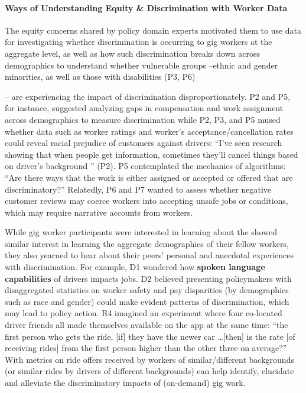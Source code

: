 \paragraph{{Ways of Understanding Equity \& Discrimination with Worker Data}} \label{data_disc} 

{The} equity concerns {shared by policy domain experts} motivated them to use data for investigating whether discrimination is occurring to gig workers {at the aggregate level, as well as how such discrimination breaks down across }demographics to understand whether vulnerable groups --ethnic and gender minorities{, as well as }those with disabilities (P3, P6){-- are experiencing the impact of discrimination disproportionately. P2 and P5{, for instance, suggested analyzing} gaps in compensation and work assignment across demographics to measure discrimination { while} P2, P3, and P5 mused whether data such as worker {ratings} and worker's {acceptance/cancellation} rates could reveal racial prejudice of customers against drivers: ``I've seen research showing that when people get information, sometimes they'll cancel things based on driver's background '' (P2). P5 {contemplated} the mechanics of algorithms: ``Are there ways that the work is either assigned or accepted or offered that are discriminatory?'' Relatedly, P6 and P7 wanted to assess whether negative customer reviews may coerce workers into accepting unsafe jobs or conditions, which may require narrative accounts from workers. 

While gig worker participants were 
interested in learning about the {showed similar interest in learning the aggregate }demographics of their fellow workers{, they also yearned to hear about their peers' personal and anecdotal} experiences with discrimination. For example, D1 {wondered} how \textbf{spoken language capabilities} of drivers impacts jobs. 
D2 believed presenting policymakers with {disaggregated} statistics on worker safety and pay disparities {(}by demographics such as {race and gender}{)} could make evident patterns of discrimination{, which may} lead to policy action. 
{R4 imagined an experiment where four co-located driver friends all made themselves available on the app at the same time: ``the first person who gets the ride, [if] they have the newer car  \dots  [then] is the rate [of receiving rides] from the first person higher than the other three on average?'' With metrics on ride offers received by workers of similar/different backgrounds (or similar rides by drivers of different backgrounds) can help identify, elucidate and alleviate the discriminatory impacts of (on-demand) gig work.}



}
